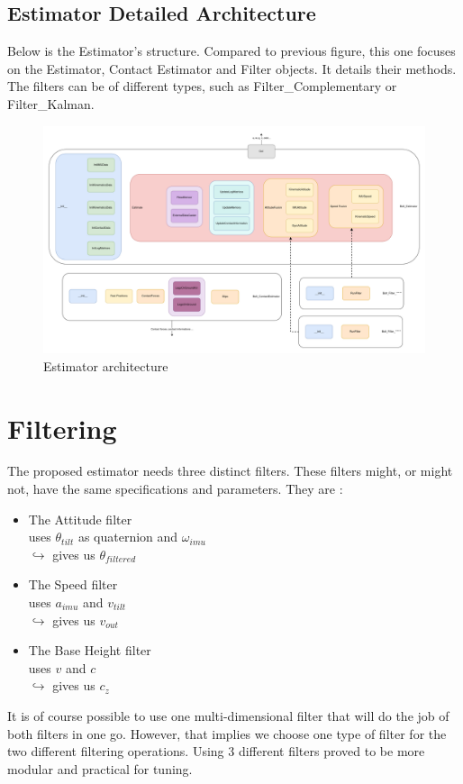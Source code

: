 \documentclass[a4paper,10pt]{article}
\begin{document}
\subsection{Estimator Detailed Architecture}
Below is the Estimator's structure. Compared to previous figure, this one focuses on the Estimator, Contact Estimator and Filter objects. It details their methods. The filters can be of different types, such as Filter\_Complementary or Filter\_Kalman.
\begin{figure}[H]
\label{fig:estimator_full_architecture}
\hspace{-2.5cm} 
  \includegraphics[width=\linewidth, angle=0, scale=1.4]{./images/BoltEstimator0_full_200.png}
  \caption{Estimator architecture}
\end{figure}


\section{Filtering}
The proposed estimator needs three distinct filters. These filters might, or might not, have the same specifications and parameters. They are :
\begin{itemize}
	\item{The Attitude filter\\
	uses $\theta_{tilt}$ as quaternion and $\omega_{imu}$\\
	$\hookrightarrow$ gives us $\theta_{filtered}$}
	\item{The Speed filter\\
	uses $a_{imu}$ and $v_{tilt}$\\
	$\hookrightarrow$ gives us $v_{out}$}
	\item{The Base Height filter\\
	uses $v$ and $c$\\
	$\hookrightarrow$ gives us $c_z$}
\end{itemize}
It is of course possible to use one multi-dimensional filter that will do the job of both filters in one go. However, that implies we choose one type of filter for the two different filtering operations. Using 3 different filters proved to be more modular and practical for tuning. \\
\end{document}
